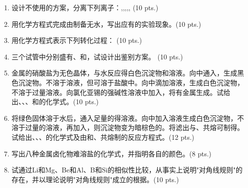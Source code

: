 \begin{enumerate}[label=\arabic*., start=1, itemsep=1.5ex]
    \item 设计不使用的方案，分离下列离子：,,,,, (10 pts.)

    \item 用化学方程式完成由制备无水，写出应有的实验现象。(10 pts.)

    \item 用化学方程式表示下列转化过程： (10 pts.)
    
    \item 三个试管中分别盛有、和，试设计出鉴别方案。 (10 pts.)
    
    \item 金属的硝酸盐为无色晶体，与水反应得白色沉淀物和溶液。向中通入，生成黑色沉淀物。不溶于溶液，但可溶于盐酸中。向中滴加溶液，生成白色沉淀物，不溶于过量溶液。向氯化亚锡的强碱性溶液中加入，将有金属生成。试给出、、、和的化学式。(10 pts.)
    
    \item 将绿色固体溶于水后，通入足量的得溶液。向中加入溶液生成白色沉淀物，不溶于过量的溶液，再加入，则沉淀物变为暗棕色的。将滤出与、共熔可制得。试给出、、、的化学式及由和、共熔制的反应方程式。(12 pts.)
    
    \item 写出八种金属卤化物难溶盐的化学式，并指明各自的颜色。(8 pts.)
    
    \item 试通过Li和Mg、Be和Al、B和Si的相似性比较，从事实上说明"对角线规则"的存在，并以理论说明"对角线规则"成立的根据。(10 pts.)
\end{enumerate}


